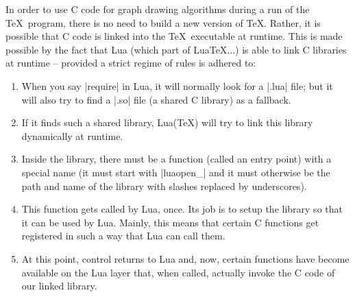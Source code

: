 In order to use C code for graph drawing algorithms during a run of the \TeX\
program, there is no need to build a new version of \TeX. Rather, it is
possible that C code is linked into the \TeX\ executable at runtime. This is
made possible by the fact that Lua (which part of Lua\TeX$\dots$) is able to
link C libraries at runtime -- provided a strict regime of rules is adhered to:
%
\begin{enumerate}
    \item When you say |require| in Lua, it will normally look for a |.lua|
        file; but it will also try to find a |.so| file (a shared C library) as
        a fallback.
    \item If it finds such a shared library, Lua(\TeX) will try to link this
        library dynamically at runtime.
    \item Inside the library, there must be a function (called an entry point)
        with a special name (it must start with |luaopen_| and it must
        otherwise be the path and name of the library with slashes replaced by
        underscores).
    \item This function gets called by Lua, once. Its job is to setup the
        library so that it can be used by Lua. Mainly, this means that certain
        C functions get registered in such a way that Lua can call them.
    \item At this point, control returns to Lua and, now, certain functions
        have become available on the Lua layer that, when called, actually
        invoke the C code of our linked library.
\end{enumerate}

